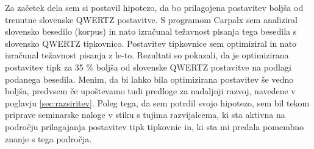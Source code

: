 

  Za začetek dela sem si postavil hipotezo, da bo prilagojena postavitev boljša od trenutne slovenske QWERTZ postavitve.
  S programom Carpalx sem analiziral slovensko besedilo (korpus) in nato izračunal
  težavnost pisanja tega besedila s slovensko QWERTZ tipkovnico.
  Postavitev tipkovnice sem optimiziral in nato izračunal težavnost pisanja z le-to.
  Rezultati so pokazali, da je optimizirana postavitev tipk za 35 \% boljša od slovenske QWERTZ postavitve
  na podlagi podanega besedila.
  Menim, da bi lahko bila optimizirana postavitev še vedno boljša,
  predvsem če upoštevamo tudi predloge za nadaljnji razvoj, navedene v poglavju \ref{sec:razsiritev}.
  Poleg tega, da sem potrdil svojo hipotezo, sem bil tekom priprave seminarske naloge v stiku s tujima razvijalcema,
  ki sta aktivna na področju prilagajanja postavitev tipk tipkovnic in,
  ki sta mi predala pomembno znanje s tega področja.

